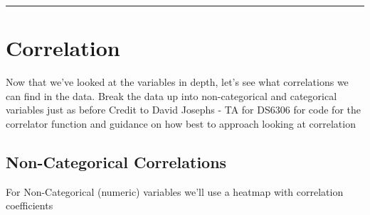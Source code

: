 \documentclass[]{article}
\newenvironment{Shaded}{\begin{snugshade}}{\end{snugshade}}
\newcommand{\KeywordTok}[1]{\textcolor[rgb]{0.13,0.29,0.53}{\textbf{#1}}}
\newcommand{\DataTypeTok}[1]{\textcolor[rgb]{0.13,0.29,0.53}{#1}}
\newcommand{\DecValTok}[1]{\textcolor[rgb]{0.00,0.00,0.81}{#1}}
\newcommand{\FloatTok}[1]{\textcolor[rgb]{0.00,0.00,0.81}{#1}}
\newcommand{\StringTok}[1]{\textcolor[rgb]{0.31,0.60,0.02}{#1}}
\newcommand{\CommentTok}[1]{\textcolor[rgb]{0.56,0.35,0.01}{\textit{#1}}}
\newcommand{\ControlFlowTok}[1]{\textcolor[rgb]{0.13,0.29,0.53}{\textbf{#1}}}
\newcommand{\OperatorTok}[1]{\textcolor[rgb]{0.81,0.36,0.00}{\textbf{#1}}}
\newcommand{\NormalTok}[1]{#1}
\begin{document}
\begin{center}\rule{0.5\linewidth}{\linethickness}\end{center}

\section{Correlation}\label{correlation}

Now that we've looked at the variables in depth, let's see what
correlations we can find in the data. Break the data up into
non-categorical and categorical variables just as before Credit to David
Josephs - TA for DS6306 for code for the correlator function and
guidance on how best to approach looking at correlation

\subsection{Non-Categorical
Correlations}\label{non-categorical-correlations}

For Non-Categorical (numeric) variables we'll use a heatmap with
correlation coefficients

\begin{Shaded}
\end{Shaded}
\end{document}
